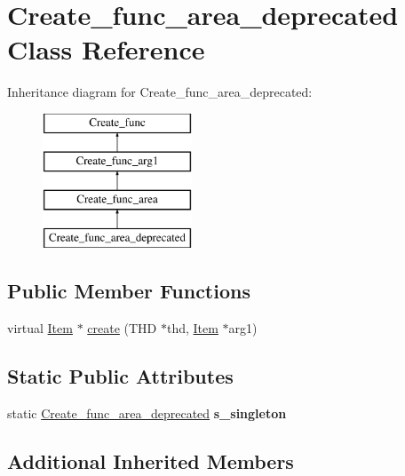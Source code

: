 \hypertarget{classCreate__func__area__deprecated}{}\section{Create\+\_\+func\+\_\+area\+\_\+deprecated Class Reference}
\label{classCreate__func__area__deprecated}
Inheritance diagram for Create\+\_\+func\+\_\+area\+\_\+deprecated\+:\begin{figure}[H]
\begin{center}
\leavevmode
\includegraphics[height=4.000000cm]{classCreate__func__area__deprecated}
\end{center}
\end{figure}
\subsection*{Public Member Functions}
\begin{DoxyCompactItemize}
\item 
virtual \mbox{\hyperlink{classItem}{Item}} $\ast$ \mbox{\hyperlink{classCreate__func__area__deprecated_a8f1158f60042c56c8958242d069d65b1}{create}} (T\+HD $\ast$thd, \mbox{\hyperlink{classItem}{Item}} $\ast$arg1)
\end{DoxyCompactItemize}
\subsection*{Static Public Attributes}
\begin{DoxyCompactItemize}
\item 
\mbox{\label{classCreate__func__area__deprecated_afce1738cadbd88a9726157bdc98436a3}} 
static \mbox{\hyperlink{classCreate__func__area__deprecated}{Create\+\_\+func\+\_\+area\+\_\+deprecated}} {\bfseries s\+\_\+singleton}
\end{DoxyCompactItemize}
\subsection*{Additional Inherited Members}


